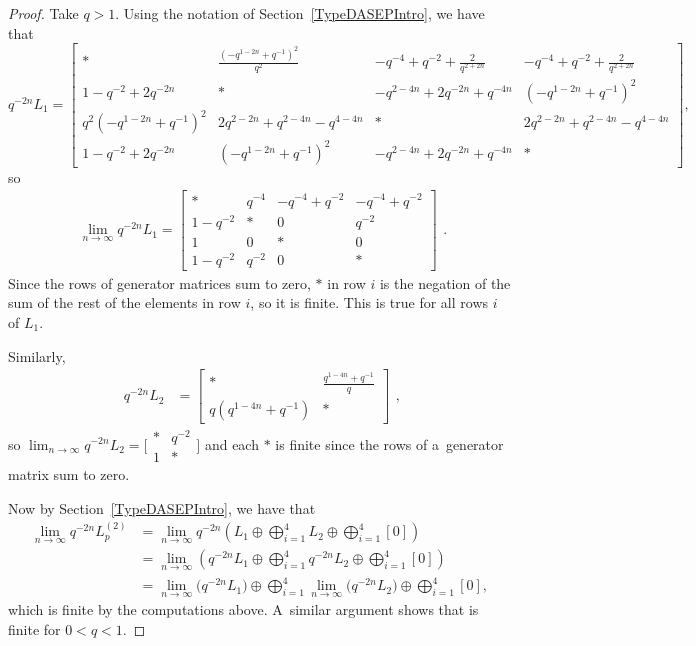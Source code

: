\documentclass[10pt,a4paper]{amsart}
\numberwithin{equation}{section}
\theoremstyle{definition}
\begin{document}
\begin{proof}
\label{finite_proof}
Take $q >1$. Using the notation of Section~\ref{TypeDASEPIntro}, we have that
\[
q^{-2n} L_1 =\left[\begin{smallmatrix} * & \frac{(- q^{1 - 2n} + q^{- 1})^{2}}{q^{2}} & - q^{- 4} + q^{ - 2} + \frac{2}{q^{2+2n}} & - q^{- 4} + q^{ - 2} + \frac{2}{q^{2+2n}}
\\1 - q^{ - 2} + 2q^{-2n} & * & - q^{2 - 4 n} + 2q^{-2n} + q^{- 4 n} & \left(- q^{1 - 2n} + q^{- 1}\right)^{2}
\\ q^{2} \left(- q^{1 - 2n} + q^{- 1}\right)^{2} & 2 q^{2-2n} + q^{2 - 4 n} - q^{4 - 4 n} & * & 2 q^{2-2n} + q^{2 - 4 n} - q^{4 - 4 n}
\\ 1 - q^{- 2} + 2q^{-2n} & \left(- q^{1 - 2n} + q^{- 1}\right)^{2} & - q^{2 - 4 n} + 2q^{-2n} + q^{- 4 n} & *
\end{smallmatrix}\right],
\]
so
\[\begin{aligned}
 \lim_{n \to \infty} q^{-2n} L_1= \begin{bmatrix} * & q^{-4} & - q^{- 4} + q^{ - 2} & - q^{- 4} + q^{ - 2}
\\1 - q^{ - 2} & * & 0 & q^{-2}
\\ 1 & 0 & * & 0
\\ 1 - q^{- 2} & q^{-2} & 0 & *
\end{bmatrix}
\end{aligned}.\]
Since the rows of generator matrices sum to zero, $*$ in row $i$ is the negation of the sum of the rest of the elements in row $i$, so it is finite. This is true for all rows $i$ of $L_1$.

Similarly,
\[\begin{aligned}
 q^{-2n}L_2
 &=\begin{bmatrix} * & \frac{q^{1 - 4 n} + q^{- 1}}{q}\\q \left(q^{1 - 4n} + q^{- 1}\right) & * \end{bmatrix}
\end{aligned}, \]
so $
 \lim_{n \to \infty} q^{-2n} L_2 =\big[
\begin{smallmatrix} * & q^{-2} \\1 & * \end{smallmatrix}\big]$
and each $*$ is finite since the rows of a~generator matrix sum to zero.

Now by Section~\ref{TypeDASEPIntro}, we have that
\begin{align*}
 \lim_{n \to \infty} q^{-2n} L_p^{(2)} &=\lim_{n \to \infty} q^{-2n} \left(L_1 \oplus \bigoplus_{i=1}^4 L_2 \oplus \bigoplus_{i=1}^4 [0]\right) \\
 &=
\lim_{n \to \infty} \left(q^{-2n} L_1 \oplus \bigoplus_{i=1}^4 q^{-2n}L_2 \oplus \bigoplus_{i=1}^4 [0]\right) \\
&= \lim_{n \to \infty} \bigl(q^{-2n} L_1\bigr) \oplus \bigoplus_{i=1}^4 \lim_{n \to \infty} \bigl(q^{-2n}L_2\bigr) \oplus \bigoplus_{i=1}^4 [0],
\end{align*}
which is finite by the computations above. A~similar argument shows that  is finite for $0 < q< 1$.


\end{proof}
\end{document}
